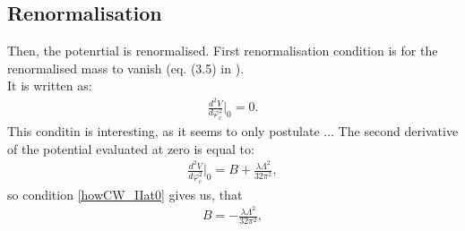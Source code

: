 \subsection{Renormalisation}
Then, the potenrtial is renormalised. First renormalisation condition is for the 
renormalised mass to vanish (eq. (3.5) in \cite{Coleman1973}). \\
It is written as:
\begin{align}\label{howCW_IIat0}
\frac{d^2V}{d\varphi_c^2}\Big|_0=0.
\end{align}
This conditin is interesting, as it seems to only postulate  ... 
The second derivative of the potential evaluated at zero is equal to:
\begin{align}
\frac{d^2V}{d\varphi_c^2}\Big|_0 = B+\frac{\lambda\Lambda^2}{32\pi^2},
\end{align}
so condition \ref{howCW_IIat0} gives us, that 
\begin{align}
B = -\frac{\lambda\Lambda^2}{32\pi^2},
\end{align}

